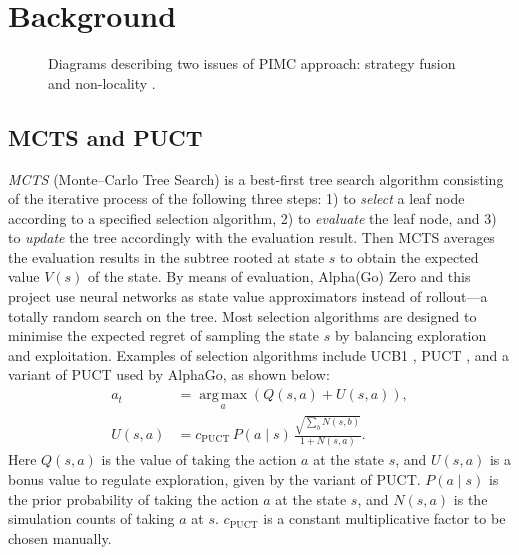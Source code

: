 \documentclass[10pt,twocolumn,letterpaper]{article}
\begin{document}
\section{Background}
\label{sec:background}
\begin{figure}[t]
   \centering
   \caption{Diagrams describing two issues of PIMC approach: strategy fusion and non-locality \cite{LonStu2010}.}
   \label{fig:pimc-problems}
\end{figure}

\subsection{MCTS and PUCT}
\textit{MCTS} (Monte--Carlo Tree Search) is a best-first tree search algorithm consisting of the iterative process of the following three steps: 1) to \textit{select} a leaf node according to a specified selection algorithm, 2) to \textit{evaluate} the leaf node, and 3) to \textit{update} the tree accordingly with the evaluation result.
Then MCTS averages the evaluation results in the subtree rooted at state $s$ to obtain the expected value $V(s)$ of the state. By means of evaluation, Alpha(Go) Zero and this project use neural networks as state value approximators instead of rollout---a totally random search on the tree.
Most selection algorithms are designed to minimise the expected regret of sampling the state $s$ by balancing exploration and exploitation.
Examples of selection algorithms include UCB1 \cite{KocSze2006}, PUCT \cite{Ros2011}, and a variant of PUCT used by AlphaGo, as shown below:
\begin{align*}
   a_t &= \mathop{\operatorname{arg\,max}}\limits_{a} \left( Q(s, a) + U(s, a) \right),
   \\U(s, a) &= c_\textrm{PUCT}\, P(a\mid s)\,\frac{\sqrt{\sum_b N(s, b)}}{1 + N(s, a)}.
\end{align*}
Here $Q(s, a)$ is the value of taking the action $a$ at the state $s$, and $U(s, a)$ is a bonus value to regulate exploration, given by the variant of PUCT. $P(a\mid s)$ is the prior probability of taking the action $a$ at the state $s$, and $N(s, a)$ is the simulation counts of taking $a$ at $s$. $c_\text{PUCT}$ is a constant multiplicative factor to be chosen manually.
\end{document}
